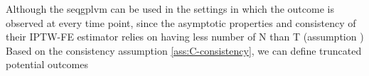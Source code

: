 Although the seqgplvm can be used in the settings in which the outcome is observed at every time point, 
since the asymptotic properties and consistency of their IPTW-FE estimator 
relies on having less number of N than T (assumption )
Based on the consistency assumption \ref{ass:C-consistency}, we can define 
truncated potential outcomes 

